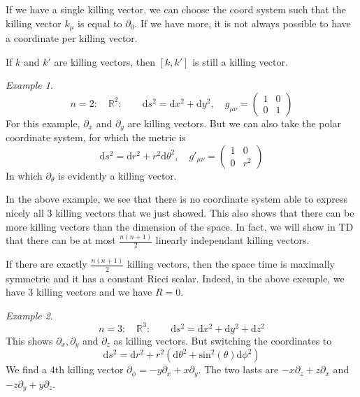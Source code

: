 \documentclass[a4paper]{book}
\theoremstyle{definition}
\theoremstyle{remark}
\newtheorem*{example}{Example}
\begin{document}
If we have a single killing vector, we can choose the coord system such that the killing vector $k_\mu$ is equal to $\partial_0$. If we have more, it is not always possible to have a coordinate per killing vector. 

If $k$ and $k'$ are killing vectors, then $[k, k']$ is still a killing vector. 

\begin{example}
    \begin{equation}
        n=2: \quad \mathbb{R}^2:\qquad \text{d}s^2 = \text{d}x^2 + \text{d}y^2, \quad g_{\mu\nu} = \begin{pmatrix}
            1 & 0 \\ 0 & 1
        \end{pmatrix}
    \end{equation}
    For this example, $\partial_x$ and $\partial_y$ are killing vectors. 
    But we can also take the polar coordinate system, for which the metric is 
    \begin{equation}
        \text{d}s^2  = \text{d}r^2 + r^2 \text{d}\theta^2, \quad g'_{\mu\nu} = \begin{pmatrix}
            1 & 0 \\ 0 & r^2
        \end{pmatrix}
    \end{equation}
    In which $\partial_\theta$ is evidently a killing vector.
\end{example}

In the above example, we see that there is no coordinate system able to express nicely all 3 killing vectors that we just showed. This also shows that there can be more killing vectors than the dimension of the space. In fact, we will show in TD that there can be at most $\frac{n(n+1)}{2}$ linearly independant killing vectors. \par \medskip 
If there are exactly $\frac{n(n+1)}{2}$ killing vectors, then the space time is maximally symmetric and it has a constant Ricci scalar. Indeed, in the above exemple, we have 3 killing vectors and we have $R = 0$. 
\begin{example}
    \begin{equation}
        n=3: \quad \mathbb{R}^3:\qquad \text{d}s^2 = \text{d}x^2 + \text{d}y^2 + \text{d}z^2
    \end{equation}
    This shows $\partial_x, \partial_y$ and $\partial_z$ as killing vectors. But switching the coordinates to 
    \begin{equation}
        \text{d}s^2 = \text{d}r^2 +r^2(\text{d}\theta^2 + \text{sin}^2(\theta) \text{d}\phi^2)
    \end{equation}
    We find a 4th killing vector $\partial_\phi = -y\partial_x + x\partial_y$. The two lasts are $-x\partial_z + z\partial_x$ and $-z\partial_y + y\partial_z$.
\end{example}
\end{document}
